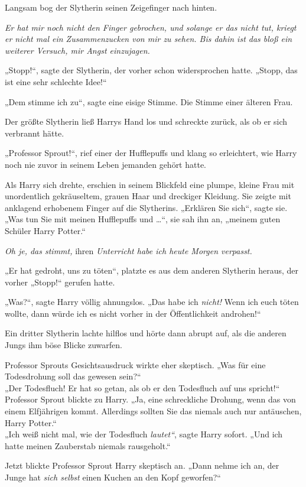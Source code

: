 {Langsam bog der Slytherin seinen Zeigefinger nach hinten.

\emph{Er hat mir noch nicht den Finger gebrochen, und solange er das nicht tut, kriegt er nicht mal ein Zusammenzucken von mir zu sehen. Bis dahin ist das bloß ein weiterer Versuch, mir Angst einzujagen.}

„Stopp!“, sagte der Slytherin, der vorher schon widersprochen hatte. „Stopp, das ist eine sehr schlechte Idee!“

„Dem stimme ich zu“, sagte eine eisige Stimme. Die Stimme einer älteren Frau.

Der größte Slytherin ließ Harrys Hand los und schreckte zurück, als ob er sich verbrannt hätte.

„Professor Sprout!“, rief einer der Hufflepuffs und klang so erleichtert, wie Harry noch nie zuvor in seinem Leben jemanden gehört hatte.

Als Harry sich drehte, erschien in seinem Blickfeld eine plumpe, kleine Frau mit unordentlich gekräuseltem, grauen Haar und dreckiger Kleidung. Sie zeigte mit anklagend erhobenem Finger auf die Slytherins. „Erklären Sie sich“, sagte sie. „Was tun Sie mit meinen Hufflepuffs und …“, sie sah ihn an, „meinem guten Schüler Harry Potter.“

\emph{Oh je, das stimmt,} ihren \emph{Unterricht habe ich heute Morgen verpasst.}

„Er hat gedroht, uns zu töten“, platzte es aus dem anderen Slytherin heraus, der vorher „Stopp!“ gerufen hatte.

„Was?“, sagte Harry völlig ahnungslos. „Das habe ich \emph{nicht!} Wenn ich euch töten wollte, dann würde ich es nicht vorher in der Öffentlichkeit androhen!“

Ein dritter Slytherin lachte hilflos und hörte dann abrupt auf, als die anderen Jungs ihm böse Blicke zuwarfen.

Professor Sprouts Gesichtsausdruck wirkte eher skeptisch. „Was für eine Todesdrohung soll das gewesen sein?“\\ „Der Todesfluch! Er hat so getan, als ob er den Todesfluch auf uns spricht!“\\ Professor Sprout blickte zu Harry. „Ja, eine schreckliche Drohung, wenn das von einem Elfjährigen kommt. Allerdings sollten Sie das niemals auch nur antäuschen, Harry Potter.“\\ „Ich weiß nicht mal, wie der Todesfluch \emph{lautet“}, sagte Harry sofort. „Und ich hatte meinen Zauberstab niemals rausgeholt.“

Jetzt blickte Professor Sprout Harry skeptisch an. „Dann nehme ich an, der Junge hat \emph{sich selbst} einen Kuchen an den Kopf geworfen?“

}
